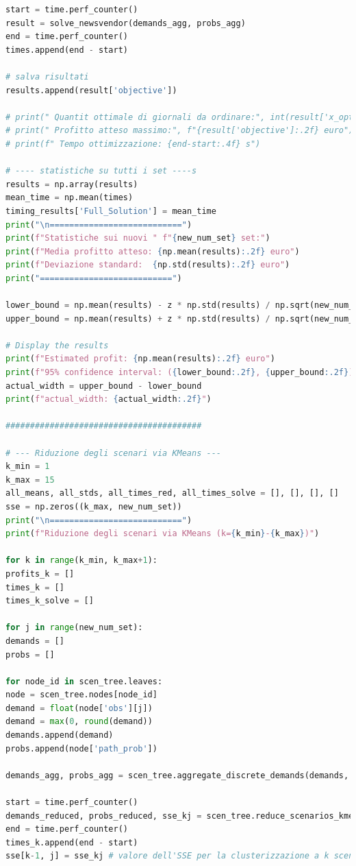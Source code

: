 \documentclass[a4paper,12pt]{article}
\begin{document}
\begin{lstlisting}[language=python,caption={Main of Newvendor problem},label={lst:main-nv}]
start = time.perf_counter()
result = solve_newsvendor(demands_agg, probs_agg)
end = time.perf_counter()
times.append(end - start)

# salva risultati
results.append(result['objective'])

# print(" Quantit ottimale di giornali da ordinare:", int(result['x_opt']))
# print(" Profitto atteso massimo:", f"{result['objective']:.2f} euro")
# print(f" Tempo ottimizzazione: {end-start:.4f} s")

# ---- statistiche su tutti i set ----s
results = np.array(results)
mean_time = np.mean(times)
timing_results['Full_Solution'] = mean_time
print("\n===========================")
print(f"Statistiche sui nuovi " f"{new_num_set} set:")
print(f"Media profitto atteso: {np.mean(results):.2f} euro")
print(f"Deviazione standard:  {np.std(results):.2f} euro")
print("===========================")

lower_bound = np.mean(results) - z * np.std(results) / np.sqrt(new_num_set)
upper_bound = np.mean(results) + z * np.std(results) / np.sqrt(new_num_set)

# Display the results
print(f"Estimated profit: {np.mean(results):.2f} euro")
print(f"95% confidence interval: ({lower_bound:.2f}, {upper_bound:.2f})")
actual_width = upper_bound - lower_bound
print(f"actual_width: {actual_width:.2f}")

########################################

# --- Riduzione degli scenari via KMeans ---
k_min = 1
k_max = 15
all_means, all_stds, all_times_red, all_times_solve = [], [], [], []
sse = np.zeros((k_max, new_num_set))
print("\n===========================")
print(f"Riduzione degli scenari via KMeans (k={k_min}-{k_max})")

for k in range(k_min, k_max+1):
profits_k = []
times_k = []
times_k_solve = []

for j in range(new_num_set):
demands = []
probs = []

for node_id in scen_tree.leaves:
node = scen_tree.nodes[node_id]
demand = float(node['obs'][j])
demand = max(0, round(demand))
demands.append(demand)
probs.append(node['path_prob'])

demands_agg, probs_agg = scen_tree.aggregate_discrete_demands(demands, probs)

start = time.perf_counter()
demands_reduced, probs_reduced, sse_kj = scen_tree.reduce_scenarios_kmeans_1D(demands_agg, probs_agg, k=k)
end = time.perf_counter()
times_k.append(end - start)
sse[k-1, j] = sse_kj # valore dell'SSE per la clusterizzazione a k scenari, del j-esimo campione 


\end{lstlisting}
\end{document}
